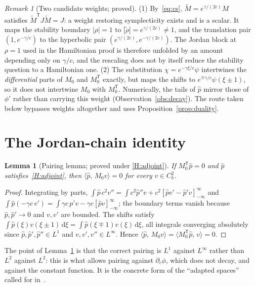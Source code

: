 \documentclass[11pt]{article}
\theoremstyle{plain}
\newtheorem{lemma}[theorem]{Lemma}
\theoremstyle{definition}
\theoremstyle{remark}
\newtheorem{remark}[theorem]{Remark}
\newcommand{\ip}[2]{\langle #1,\,#2\rangle}
\newcommand{\ph}{\hat p}
\newcommand{\dd}{\mathrm{d}}
\newcommand{\T}{\mathsf T}
\newcommand{\tagP}{\textsf{proved}}
\newcommand{\tagC}[1]{\textsf{proved under #1}}
\begin{document}
\begin{remark}[Two candidate weights; \tagP]\label{rem:weights}
(1) By~\eqref{eq:cs}, $\tilde M=e^{\gamma/(2c)}M$ satisfies $\tilde M^{\T}J\tilde M=J$: a weight
restoring symplecticity exists and is a scalar. It maps the stability boundary $|\rho|=1$ to
$|\tilde\rho|=e^{\gamma/(2c)}\neq1$, and the translation pair $(1,e^{-\gamma/c})$ to the
hyperbolic pair $(e^{\gamma/(2c)},e^{-\gamma/(2c)})$. The Jordan block at $\rho=1$ used in the
Hamiltonian proof is therefore unfolded by an amount depending only on $\gamma/c$, and the
rescaling does not by itself reduce the stability question to a Hamiltonian one.
(2) The substitution $\chi=e^{-\gamma\xi/c}\psi$ intertwines the \emph{differential} parts of
$M_0$ and $M_0^{\T}$ exactly, but maps the shifts to
$e^{\mp\gamma/c}\psi(\xi\pm1)$, so it does not intertwine $M_0$ with $M_0^{\T}$. Numerically,
the tails of $\ph$ mirror those of $\phi'$ rather than carrying this weight
(Observation~\ref{obs:decay}). The route taken below bypasses weights altogether and uses
Proposition~\ref{prop:duality}.
\end{remark}

\section{The Jordan-chain identity}\label{sec:identity}

\begin{lemma}[Pairing lemma; \tagC{\ref{H:adjoint}}]\label{lem:pairing}
If $M_0^{\T}\ph=0$ and $\ph$ satisfies~\ref{H:adjoint}, then $\ip{\ph}{M_0v}=0$ for every
$v\in C^2_b$.
\end{lemma}

\begin{proof}
Integrating by parts, $\int\ph\,c^2v''=\int c^2\ph''v+c^2[\ph v'-\ph'v]_{-\infty}^{\infty}$ and
$\int\ph(-\gamma c\,v')=\int\gamma c\,\ph'v-\gamma c[\ph v]_{-\infty}^{\infty}$; the boundary terms
vanish because $\ph,\ph'\to0$ and $v,v'$ are bounded. The shifts satisfy
$\int\ph(\xi)v(\xi\pm1)\,\dd\xi=\int\ph(\xi\mp1)v(\xi)\,\dd\xi$, all integrals converging
absolutely since $\ph,\ph',\ph''\in L^1$ and $v,v',v''\in L^\infty$. Hence
$\ip{\ph}{M_0v}=\ip{M_0^{\T}\ph}{v}=0$.
\end{proof}

The point of Lemma~\ref{lem:pairing} is that the correct pairing is $L^1$ against
$L^\infty$ rather than $L^2$ against $L^2$: this is what allows pairing against
$\partial_c\phi$, which does not decay, and against the constant function. It is the concrete
form of the ``adapted spaces'' called for in~\cite{VCKX20}.
\end{document}
